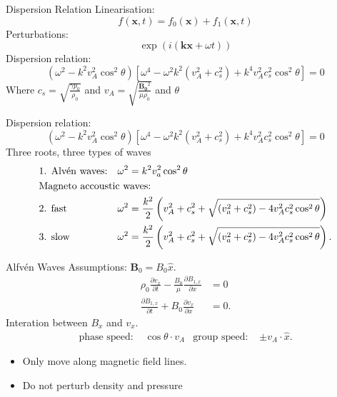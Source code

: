\documentclass{beamer}
\begin{document}
\begin{frame}{Dispersion Relation}
    Linearisation:
        \begin{equation*}
            f(\mathbf{x},t) = f_0(\mathbf{x}) + f_1(\mathbf{x},t)
        \end{equation*}
    Perturbations:
        \begin{equation*}
            \exp(i(\mathbf{kx} + \omega t))
        \end{equation*}
    Dispersion relation:
        \begin{equation*}
	        (\omega^2 - k^2 v_A^2 \cos^2 \theta)\left[ \omega^{4} - \omega^2k^2(v_A^2 + c_s^2) + k^{4}v_A^2c_s^2\cos^2\theta \right]  = 0
        \end{equation*}
        Where $c_s = \sqrt{\frac{\gamma p_0}{\rho_0}}$ and $v_A = \sqrt{\frac{\mathbf{B_0}^2}{\mu\rho_0}}$ and $\theta$
\end{frame}
\begin{frame}
    Dispersion relation:
        \begin{equation*}
	        (\omega^2 - k^2 v_A^2 \cos^2 \theta)\left[ \omega^{4} - \omega^2k^2(v_A^2 + c_s^2) + k^{4}v_A^2c_s^2\cos^2\theta \right]  = 0
        \end{equation*}
Three roots, three types of waves
\begin{align*}
&\text{1. Alv\'en waves:}	& \omega^2 &= k^2 v_a^2 \cos^2 \theta\\
&\text{Magneto accoustic waves:}\hspace{-4cm}\\
&\text{2. fast} 
& \omega^2 &= \frac{k^2}{2}\left( v_A^2 + c_s^2 + \sqrt{(v_a^2 + c_s^2) - 4 v_A^2 c_s^2 \cos^2\theta}  \right) \\
& \text{3. slow} & 
	\omega^2 &= \frac{k^2}{2}\left( v_A^2 + c_s^2 + \sqrt{(v_a^2 + c_s^2) - 4 v_A^2 c_s^2 \cos^2\theta}  \right) 
.\end{align*}
\end{frame}
\begin{frame}{Alfv\'en Waves}
	Assumptions: $\mathbf B_0 = B_0 \hat{x}$. 
	\begin{align*}
		\rho_0 \frac{\partial v_x}{\partial t}  - \frac{B_0}{\mu}\frac{\partial B_{1, x}}{\partial x}  &= 0 \\
		\frac{\partial B_{1,x}}{\partial t}  + B_0 \frac{\partial v_x}{\partial x} &= 0 
	.\end{align*}
	Interation between $B_x$ and $v_x$. 
	\begin{align*}
		\text{phase speed: } & \cos\theta \cdot v_A & \text{group speed: } & \pm v_A \cdot \hat{x}
	.\end{align*}
	\begin{itemize}
		\item Only move along magnetic field lines.
		\item Do not perturb density and pressure
	\end{itemize}
\end{frame}
\end{document}
